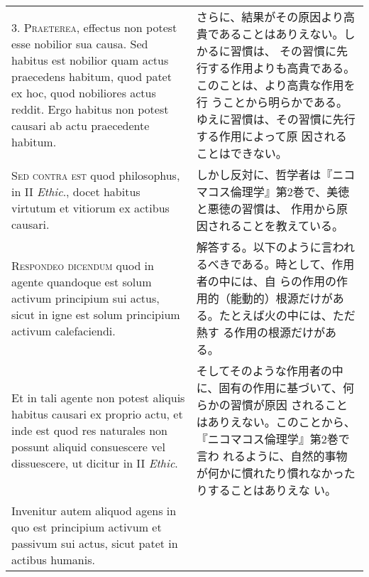 \documentclass[10pt]{jsarticle} %
\begin{document}
\begin{longtable}{p{21em}p{21em}}
\\




3. {\scshape Praeterea}, effectus non potest esse nobilior sua
causa. Sed habitus est nobilior quam actus praecedens habitum, quod
patet ex hoc, quod nobiliores actus reddit. Ergo habitus non potest
causari ab actu praecedente habitum.

&

さらに、結果がその原因より高貴であることはありえない。しかるに習慣は、
その習慣に先行する作用よりも高貴である。このことは、より高貴な作用を行
うことから明らかである。ゆえに習慣は、その習慣に先行する作用によって原
因されることはできない。

\\




{\scshape Sed contra est} quod philosophus, in II {\itshape Ethic}.,
docet habitus virtutum et vitiorum ex actibus causari.

&

しかし反対に、哲学者は『ニコマコス倫理学』第2巻で、美徳と悪徳の習慣は、
作用から原因されることを教えている。

\\




{\scshape Respondeo dicendum} quod in agente quandoque est solum
activum principium sui actus, sicut in igne est solum principium
activum calefaciendi.


&

解答する。以下のように言われるべきである。時として、作用者の中には、自
らの作用の作用的（能動的）根源だけがある。たとえば火の中には、ただ熱す
る作用の根源だけがある。

\\


Et in tali agente non potest aliquis habitus causari ex proprio actu,
et inde est quod res naturales non possunt aliquid consuescere vel
dissuescere, ut dicitur in II {\itshape Ethic}.


&

そしてそのような作用者の中に、固有の作用に基づいて、何らかの習慣が原因
されることはありえない。このことから、『ニコマコス倫理学』第2巻で言わ
れるように、自然的事物が何かに慣れたり慣れなかったりすることはありえな
い。

\\


Invenitur autem aliquod agens in quo est principium activum et
passivum sui actus, sicut patet in actibus humanis.



\end{longtable}
\end{document}
